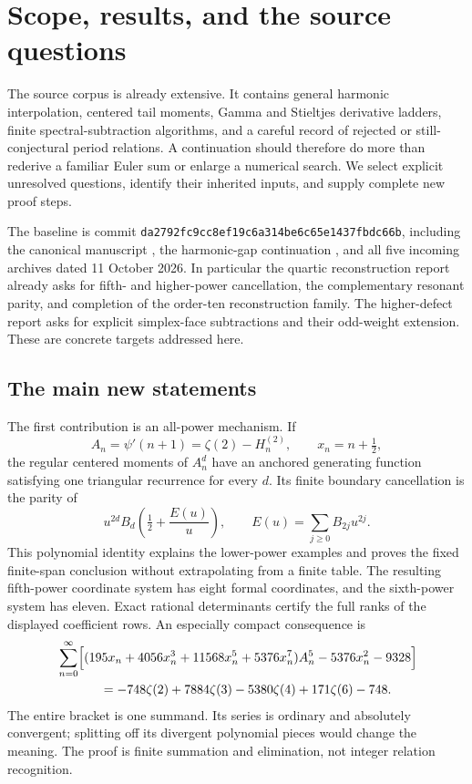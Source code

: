 \section{Scope, results, and the source questions}
\label{sec:scope}

The source corpus is already extensive. It contains general harmonic
interpolation, centered tail moments, Gamma and Stieltjes derivative
ladders, finite spectral-subtraction algorithms, and a careful record
of rejected or still-conjectural period relations. A continuation should
therefore do more than rederive a familiar Euler sum or enlarge a
numerical search. We select explicit unresolved questions, identify
their inherited inputs, and supply complete new proof steps.

The baseline is commit
\texttt{da2792fc9cc8ef19c6a314be6c65e1437fbdc66b}, including the canonical
manuscript \cite{RepoMain}, the harmonic-gap continuation
\cite{gm:gaps-source}, and all five incoming archives dated 11 October
2026. In particular the quartic reconstruction report \cite{RepoQuartic}
already asks for fifth- and higher-power cancellation, the complementary
resonant parity, and completion of the order-ten reconstruction family.
The higher-defect report \cite{sd:HigherDefects} asks for explicit
simplex-face subtractions and their odd-weight extension. These are
concrete targets addressed here.

\subsection{The main new statements}

The first contribution is an all-power mechanism. If
\[
 A_n=\psi'(n+1)=\zeta(2)-H_n^{(2)},\qquad x_n=n+\tfrac12,
\]
the regular centered moments of $A_n^d$ have an anchored generating
function satisfying one triangular recurrence for every $d$. Its finite
boundary cancellation is the parity of
\[
 u^{2d}B_d\!\left(\tfrac12+\frac{E(u)}u\right),
 \qquad E(u)=\sum_{j\ge0}B_{2j}u^{2j}.
\]
This polynomial identity explains the lower-power examples and proves
the fixed finite-span conclusion without extrapolating from a finite
table. The resulting fifth-power coordinate system has eight formal
coordinates, and the sixth-power system has eleven. Exact rational
determinants certify the full ranks of the displayed coefficient rows.
An especially compact consequence is
\begin{equation}\label{intro:quintic}
\begin{split}
&\sum_{n=0}^{\infty}\Bigl[
 (195x_n+4056x_n^3+11568x_n^5+5376x_n^7)A_n^5
                  -5376x_n^2-9328\Bigr]\\
&\hspace{12mm}=-748\zeta(2)+7884\zeta(3)-5380\zeta(4)
                                    +171\zeta(6)-748.
\end{split}
\end{equation}
The entire bracket is one summand. Its series is ordinary and absolutely
convergent; splitting off its divergent polynomial pieces would change
the meaning. The proof is finite summation and elimination, not integer
relation recognition.

